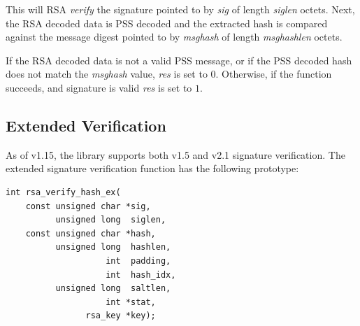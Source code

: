 \documentclass[synpaper]{book}
\begin{document}
This will RSA \textit{verify} the signature pointed to by \textit{sig} of length \textit{siglen} octets.  Next, the RSA decoded data is PSS decoded
and the extracted hash is compared against the message digest pointed to by \textit{msghash} of length \textit{msghashlen} octets.

If the RSA decoded data is not a valid PSS message, or if the PSS decoded hash does not match the \textit{msghash}
value, \textit{res} is set to $0$.  Otherwise, if the function succeeds, and signature is valid \textit{res} is set to $1$.

\subsection{Extended Verification}

As of v1.15, the library supports both v1.5 and v2.1 signature verification.  The extended signature verification function has the following prototype:

\begin{verbatim}
int rsa_verify_hash_ex(
    const unsigned char *sig,
          unsigned long  siglen,
    const unsigned char *hash,
          unsigned long  hashlen,
                    int  padding,
                    int  hash_idx,
          unsigned long  saltlen,
                    int *stat,
                rsa_key *key);
\end{verbatim}

\clearpage
{}
\printindex
\end{document}
